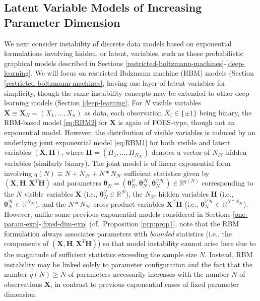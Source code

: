 \documentclass[]{article}
\theoremstyle{definition}
\begin{document}
\subsection{Latent Variable Models of Increasing Parameter
Dimension}\label{latent-variable-models-of-increasing-parameter-dimension}

We next consider instability of discrete data models based on
exponential formulations involving hidden, or latent, variables, such as
those probabilistic graphical models described in Sections
\ref{restricted-boltzmann-machines}-\ref{deep-learning}. We will focus
on restricted Bolzmann machine (RBM) models (Section
\ref{restricted-boltzmann-machines}, having one layer of latent
variables for simplicity, though the same instability concepts may be
extended to other deep learning models (Section \ref{deep-learning}. For
\(N\) visible variables
\(\boldsymbol X \equiv \boldsymbol X_N = (X_1,\ldots,X_n)\) as data,
each observation \(X_i\in\{\pm 1\}\) being binary, the RBM-based model
\eqref{eq:RBM2} for \(\boldsymbol X\) is again of FOES-type, though not an
exponential model. However, the distribution of visible variables is
induced by an underlying joint exponential model \eqref{eq:RBM1} for both
visible and latent variables \((\boldsymbol X, \boldsymbol H)\), where
\(\boldsymbol H = (H_1,\ldots,H_{N_{\mathcal{H}}})\) denotes a vector of
\(N_{\mathcal{H}}\) hidden variables (similarly binary). The joint model
is of linear exponential form involving
\(q(N)\equiv N + N_{\mathcal{H}} + N*N_{\mathcal{H}}\) sufficient
statistics given by
\((\boldsymbol X, \boldsymbol H, \boldsymbol X^T\boldsymbol H)\) and
parameters
\(\boldsymbol \theta_N = (\boldsymbol \theta_N^{\mathcal{V}},\boldsymbol \theta_N^{\mathcal{H}}, \boldsymbol \theta_N^{\mathcal{VH}} ) \in\mathbb{R}^{q(N)}\)
corresponding to the \(N\) visible variables \(\boldsymbol X\) (i.e.,
\(\boldsymbol \theta_N^{\mathcal{V}}\in\mathbb{R}^N\)), the
\(N_{\mathcal{H}}\) hidden variables \(\boldsymbol H\) (i.e.,
\(\boldsymbol \theta_N^{\mathcal{H}}\in\mathbb{R}^{N_{\mathcal{H}}}\)),
and the \(N *N_{\mathcal{H}}\) cross-product variables
\(\boldsymbol X^T\boldsymbol H\) (i.e.,
\(\boldsymbol \theta_N^{\mathcal{VH}}\in\mathbb{R}^{N*N_{\mathcal{H}}}\)).
However, unlike some previous exponential models considered in Sections
\ref{one-param-exp}-\ref{fixed-dim-exp} (cf.~Proposition
\ref{prp:prop1}, note that the RBM formulation always associates
parameters with \emph{bounded} statistics (i.e., the components of
\((\boldsymbol X, \boldsymbol H, \boldsymbol X^T\boldsymbol H)\)) so
that model instability cannot arise here due to the magnitude of
sufficient statistics exceeding the sample size \(N\). Instead, RBM
instability may be linked solely to parameter configuration and the fact
that the number \(q(N) \geq N\) of parameters necessarily increases with
the number \(N\) of observations \(\boldsymbol X\), in contrast to
previous exponential cases of fixed parameter dimension.
\end{document}
